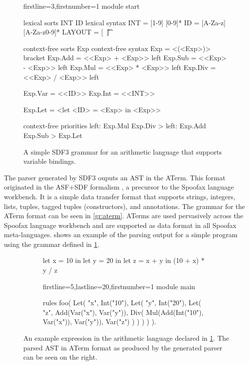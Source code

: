 \begin{figure}
  \begin{sdf3*}{firstline=3,firstnumber=1}
module start

lexical sorts INT ID
lexical syntax
  INT = [1-9] [0-9]*
  ID = [A-Za-z] [A-Za-z0-9]*
  LAYOUT = [\ \n\r\t]

context-free sorts Exp
context-free syntax
  Exp = <(<Exp>)> {bracket}
  Exp.Add = <<Exp> + <Exp>> {left}
  Exp.Sub = <<Exp> - <Exp>> {left}
  Exp.Mul = <<Exp> * <Exp>> {left}
  Exp.Div = <<Exp> / <Exp>> {left}

  Exp.Var = <<ID>>
  Exp.Int = <<INT>>

  Exp.Let = <let <ID> = <Exp> in <Exp>>

context-free priorities
  {left: Exp.Mul Exp.Div} > {left: Exp.Add Exp.Sub} > {Exp.Let}
  \end{sdf3*}
  \caption{A simple SDF3 grammar for an arithmetic language that supports variable bindings.}
  \label{fig:sdf3_example}
\end{figure}

The parser generated by SDF3 ouputs an \ac{AST} in the \acf{ATerm}. This format originated in the ASF+SDF formalism \cite{DHP:1996}, a precursor to the Spoofax language workbench. It is a simple data transfer format that supports strings, integers, lists, tuples, tagged tuples (constructors), and annotations. The grammar for the ATerm format can be seen in \cref{gr:aterm}. \acp{ATerm} are used pervasively across the Spoofax language workbench and are supported as data format in all Spoofax meta-languages.  shows an example of the parsing output for a simple program using the grammar defined in \cref{fig:sdf3_example}.\\

\begin{figure}
  \centering
  \begin{subfigure}{.35\textwidth}
    \centering
    \begin{mat}
let x = 10 in
  let y = 20 in
    let z = x + y in
      (10 + x) * y / z
    \end{mat}
  \end{subfigure}\hfill%
  \begin{subfigure}{.585\textwidth}
    \centering
    \begin{statix*}{firstline=5,lastline=20,firstnumber=1}
module main

rules
  foo(
Let(
  "x",
  Int("10"),
  Let(
    "y",
    Int("20"),
    Let(
      "z",
      Add(Var("x"), Var("y")),
      Div(
        Mul(Add(Int("10"), Var("x")), Var("y")),
        Var("z")
      )
    )
  )
)
  ).
    \end{statix*}
  \end{subfigure}
  \caption{An example expression in the arithmetic language declared in \cref{fig:sdf3_example}\protect\footnotemark. The parsed \ac{AST} in \ac{ATerm} format as produced by the generated parser can be seen on the right.}
  \label{fig:sdf3_example_parse_output}
\end{figure}

